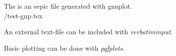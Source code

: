 \documentclass[11pt]{article} %
\begin{document}
\newpage

Ths is an eepic file generated with gnuplot.
\\

 \FIGDIR/test-gnp.tex

\newpage

An external text-file can be included with {\em verbatiminput}.



\newpage

Basic plotting can be done with {\em pgfplots}.
\\


\end{document}
